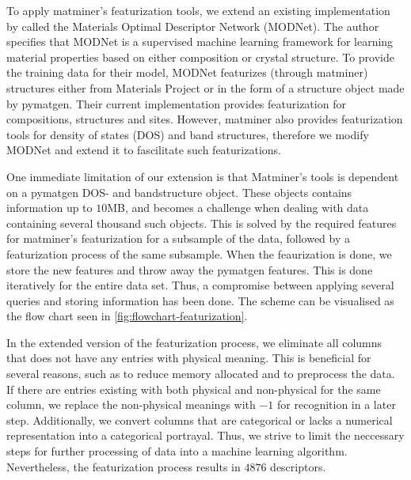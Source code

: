 To apply matminer's featurization tools, we extend an existing implementation by \citeauthor{Breuck2021} \cite{Breuck2021} called the Materials Optimal Descriptor Network (MODNet). The author \citeauthor{Breuck2021} specifies that MODNet is a supervised machine learning framework for learning material properties based on either composition or crystal structure. To provide the training data for their model, MODNet featurizes (through matminer) structures either from Materials Project or in the form of a structure object made by pymatgen. Their current implementation provides featurization for compositions, structures and sites. However, matminer also provides featurization tools for density of states (DOS) and band structures, therefore we modify MODNet and extend it to fascilitate such featurizations.



\noindent One immediate limitation of our extension is that Matminer's tools is dependent on a pymatgen DOS- and bandstructure object. These objects contains information up to $10$MB, and becomes a challenge when dealing with data containing several thousand such objects. This is solved by the required features for matminer's featurization for a subsample of the data, followed by a featurization process of the same subsample. When the feaurization is done, we store the new features and throw away the pymatgen features. This is done iteratively for the entire data set. Thus, a compromise between applying several queries and storing information has been done. The scheme can be visualised as the flow chart seen in \autoref{fig:flowchart-featurization}.

In the extended version of the featurization process, we eliminate all columns that does not have any entries with physical meaning. This is beneficial for several reasons, such as to reduce memory allocated and to preprocess the data. If there are entries existing with both physical and non-physical for the same column, we replace the non-physical meanings with $-1$ for recognition in a later step. Additionally, we convert columns that are categorical or lacks a numerical representation into a categorical portrayal. Thus, we strive to limit the neccessary steps for further processing of data into a machine learning algorithm. Nevertheless, the featurization process results in $4876$ descriptors.

